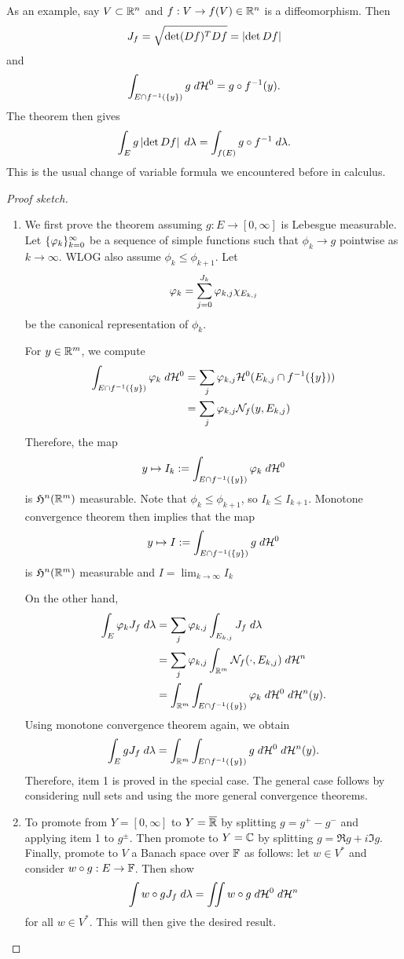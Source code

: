 \documentclass[a4paper]{article}
\begin{document}
\begin{eg}
As an example, say $V \subset \mathbb{R}^n$ and
$f : V \to f(V) \in \mathbb{R}^n$ is a diffeomorphism.
Then
\[
J_f = \sqrt{\det (Df)^T Df} = \left\lvert \det Df\right\rvert
\]
and
\[
\int_{E \cap f^{-1}(\{y\})} g \; d \mathcal{H}^0 =
g \circ f^{-1}(y).
\]
The theorem then gives
\[
\int_E g \left\lvert \det Df\right\rvert \; d \lambda
= \int_{f(E)} g \circ f^{-1} \; d \lambda.
\]
This is the usual change of variable formula we encountered
before in calculus.
\end{eg}

\begin{proof}[Proof sketch]
\begin{enumerate}
\item We first prove the theorem assuming $g : E \to [0, \infty]$
is Lebesgue measurable. Let $\{ \varphi_k \}_{k=0}^\infty$ be a sequence
of simple functions such that $\phi_k \to g$ pointwise
as $k \to \infty$. WLOG also assume $\phi_k \leq \phi_{k+1}$.
Let
\[
\varphi_k = \sum_{j=0}^{J_k} \varphi_{k, j} \chi_{E_{k, j}}
\]
be the canonical representation of $\phi_k$.

For $y \in \mathbb{R}^m$, we compute
\[
\begin{aligned}
\int_{E \cap f^{-1}(\{y\})} \varphi_k \; d \mathcal{H}^0
&= \sum_j \varphi_{k, j} \mathcal{H}^0(E_{k, j} \cap f^{-1}(\{y\})) \\
&= \sum_j \varphi_{k, j} \mathcal{N}_f (y, E_{k, j})
\end{aligned}
\]
Therefore, the map
\[
y \mapsto I_k := \int_{E \cap f^{-1}(\{y\})} \varphi_k
\; d \mathcal{H}^0
\]
is $\mathfrak{H}^n(\mathbb{R}^m)$ measurable.
Note that $\phi_k \leq \phi_{k+1}$, so $I_k \leq I_{k+1}$.
Monotone convergence theorem then implies that the map
\[
y \mapsto I := \int_{E \cap f^{-1}(\{y\})} g \; d \mathcal{H}^0
\]
is $\mathfrak{H}^n(\mathbb{R}^m)$ measurable
and $I = \lim_{k \to \infty} I_k$

On the other hand,
\[
\begin{aligned}
\int_E \varphi_k J_f \; d \lambda
&= \sum_j \varphi_{k, j} \int_{E_{k, j}} J_f \; d \lambda \\
&= \sum_j \varphi_{k, j} \int_{\mathbb{R}^m} \mathcal{N}_f(\cdot, E_{k, j})
\; d \mathcal{H}^n \\
&= \int_{\mathbb{R}^m} \int_{E \cap f^{-1}(\{y\})}
\varphi_k \; d \mathcal{H}^0 \; d \mathcal{H}^n(y).
\end{aligned}
\]
Using monotone convergence theorem again, we obtain
\[
\int_E g J_f \; d \lambda =
\int_{\mathbb{R}^m} \int_{E \cap f^{-1}(\{y\})}
g \; d \mathcal{H}^0 \; d \mathcal{H}^n (y).
\]
Therefore, item 1 is proved in the special case.
The general case follows by considering null sets and
using the more general convergence theorems.

\item To promote from $Y = [0, \infty]$
to $Y = \overline{\mathbb{R}}$ by splitting $g = g^+ - g^-$ and
applying item 1 to $g^{\pm}$. Then promote to
$Y = \mathbb{C}$ by splitting $g = \Re g + i \Im g$.
Finally, promote to $V$ a Banach space over $\mathbb{F}$ as follows:
let $w \in V^*$ and consider $w \circ g : E \to \mathbb{F}$.
Then show
\[
\int w \circ g J_f \; d \lambda = \iint w \circ g \; d \mathcal{H}^0 \; d \mathcal{H}^n
\]
for all $w \in V^*$. This will then give the desired
result.

\end{enumerate}
\end{proof}
\end{document}
